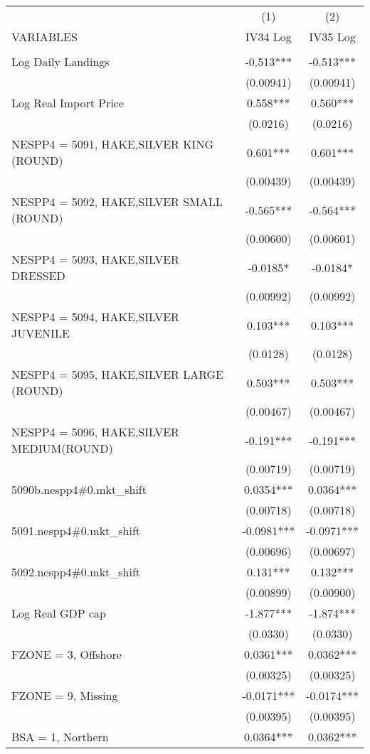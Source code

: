 \begin{tabular}{lcc} \hline
 & (1) & (2) \\
VARIABLES & IV34 Log & IV35 Log \\ \hline
 &  &  \\
Log Daily Landings & -0.513*** & -0.513*** \\
 & (0.00941) & (0.00941) \\
Log Real Import Price & 0.558*** & 0.560*** \\
 & (0.0216) & (0.0216) \\
NESPP4 = 5091, HAKE,SILVER KING (ROUND) & 0.601*** & 0.601*** \\
 & (0.00439) & (0.00439) \\
NESPP4 = 5092, HAKE,SILVER SMALL (ROUND) & -0.565*** & -0.564*** \\
 & (0.00600) & (0.00601) \\
NESPP4 = 5093, HAKE,SILVER DRESSED & -0.0185* & -0.0184* \\
 & (0.00992) & (0.00992) \\
NESPP4 = 5094, HAKE,SILVER JUVENILE & 0.103*** & 0.103*** \\
 & (0.0128) & (0.0128) \\
NESPP4 = 5095, HAKE,SILVER LARGE (ROUND) & 0.503*** & 0.503*** \\
 & (0.00467) & (0.00467) \\
NESPP4 = 5096, HAKE,SILVER MEDIUM(ROUND) & -0.191*** & -0.191*** \\
 & (0.00719) & (0.00719) \\
5090b.nespp4\#0.mkt\_shift & 0.0354*** & 0.0364*** \\
 & (0.00718) & (0.00718) \\
5091.nespp4\#0.mkt\_shift & -0.0981*** & -0.0971*** \\
 & (0.00696) & (0.00697) \\
5092.nespp4\#0.mkt\_shift & 0.131*** & 0.132*** \\
 & (0.00899) & (0.00900) \\
Log Real GDP cap & -1.877*** & -1.874*** \\
 & (0.0330) & (0.0330) \\
FZONE = 3, Offshore & 0.0361*** & 0.0362*** \\
 & (0.00325) & (0.00325) \\
FZONE = 9, Missing & -0.0171*** & -0.0174*** \\
 & (0.00395) & (0.00395) \\
BSA = 1, Northern & 0.0364*** & 0.0362*** \\

\end{tabular}
